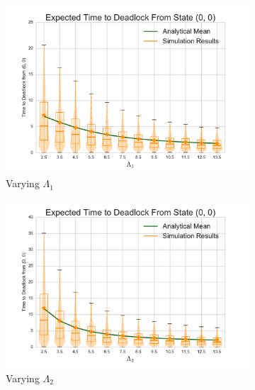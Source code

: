 \documentclass{article}
\numberwithin{equation}{section}
\begin{document}
\begin{figure}[!htbp]
\begin{center}
\begin{subfigure}[b]{0.35\textwidth}
  \includegraphics[width=\textwidth]{images/vary_L1fb}
  \caption{Varying $\Lambda_1$}
  \label{fig:timestodeadlockfb_L1}
\end{subfigure}
\begin{subfigure}[b]{0.35\textwidth}
  \includegraphics[width=\textwidth]{images/vary_L2fb}
  \caption{Varying $\Lambda_2$}
  \label{fig:timestodeadlockfb_L2}
\end{subfigure}\\
\begin{subfigure}[b]{0.35\textwidth}

\end{subfigure}
\end{center}
\end{figure}
\end{document}
